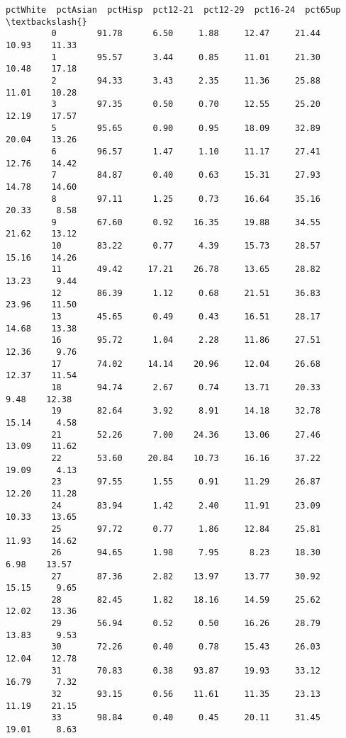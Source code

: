 \documentclass[11pt]{llncs}
\begin{document}
\begin{Verbatim}[commandchars=\\\{\}]
               pctWhite  pctAsian  pctHisp  pct12-21  pct12-29  pct16-24  pct65up  \textbackslash{}
         0        91.78      6.50     1.88     12.47     21.44     10.93    11.33   
         1        95.57      3.44     0.85     11.01     21.30     10.48    17.18   
         2        94.33      3.43     2.35     11.36     25.88     11.01    10.28   
         3        97.35      0.50     0.70     12.55     25.20     12.19    17.57   
         5        95.65      0.90     0.95     18.09     32.89     20.04    13.26   
         6        96.57      1.47     1.10     11.17     27.41     12.76    14.42   
         7        84.87      0.40     0.63     15.31     27.93     14.78    14.60   
         8        97.11      1.25     0.73     16.64     35.16     20.33     8.58   
         9        67.60      0.92    16.35     19.88     34.55     21.62    13.12   
         10       83.22      0.77     4.39     15.73     28.57     15.16    14.26   
         11       49.42     17.21    26.78     13.65     28.82     13.23     9.44   
         12       86.39      1.12     0.68     21.51     36.83     23.96    11.50   
         13       45.65      0.49     0.43     16.51     28.17     14.68    13.38   
         16       95.72      1.04     2.28     11.86     27.51     12.36     9.76   
         17       74.02     14.14    20.96     12.04     26.68     12.37    11.54   
         18       94.74      2.67     0.74     13.71     20.33      9.48    12.38   
         19       82.64      3.92     8.91     14.18     32.78     15.14     4.58   
         21       52.26      7.00    24.36     13.06     27.46     13.09    11.62   
         22       53.60     20.84    10.73     16.16     37.22     19.09     4.13   
         23       97.55      1.55     0.91     11.29     26.87     12.20    11.28   
         24       83.94      1.42     2.40     11.91     23.09     10.33    13.65   
         25       97.72      0.77     1.86     12.84     25.81     11.93    14.62   
         26       94.65      1.98     7.95      8.23     18.30      6.98    13.57   
         27       87.36      2.82    13.97     13.77     30.92     15.15     9.65   
         28       82.45      1.82    18.16     14.59     25.62     12.02    13.36   
         29       56.94      0.52     0.50     16.26     28.79     13.83     9.53   
         30       72.26      0.40     0.78     15.43     26.03     12.04    12.78   
         31       70.83      0.38    93.87     19.93     33.12     16.79     7.32   
         32       93.15      0.56    11.61     11.35     23.13     11.19    21.15   
         33       98.84      0.40     0.45     20.11     31.45     19.01     8.63   

\end{Verbatim}
\end{document}
